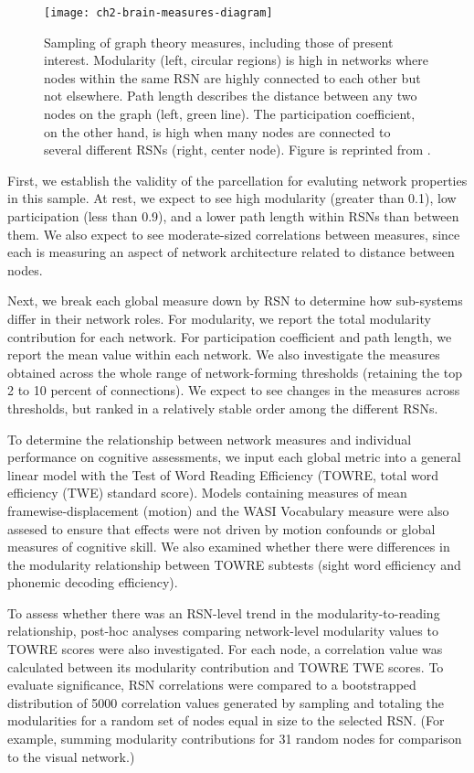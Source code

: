 \begin{figure}[t]
    \centering
    \texttt{[image: ch2-brain-measures-diagram]}
    \caption[Sampling of graph theory measures.]{Sampling of graph theory measures, including those of present interest. Modularity (left, circular regions) is high in networks where nodes within the same RSN are highly connected to each other but not elsewhere. Path length describes the distance between any two nodes on the graph (left, green line). The participation coefficient, on the other hand, is high when many nodes are connected to several different RSNs (right, center node). Figure is reprinted from \citep{Rubinov2010}.}
    \label{fig:ch2-brain-measures-diagram}
\end{figure}

First, we establish the validity of the parcellation for evaluting network properties in this sample. At rest, we expect to see high modularity (greater than 0.1), low participation (less than 0.9), and a lower path length within RSNs than between them. We also expect to see moderate-sized correlations between measures, since each is measuring an aspect of network architecture related to distance between nodes.  

Next, we break each global measure down by RSN to determine how sub-systems differ in their network roles. For modularity, we report the total modularity contribution for each network. For participation coefficient and path length, we report the mean value within each network. We also investigate the measures obtained across the whole range of network-forming thresholds (retaining the top 2 to 10 percent of connections). We expect to see changes in the measures across thresholds, but ranked in a relatively stable order among the different RSNs. 

To determine the relationship between network measures and individual performance on cognitive assessments, we input each global metric into a general linear model with the Test of Word Reading Efficiency (TOWRE, total word efficiency (TWE) standard score). Models containing measures of mean framewise-displacement (motion) and the WASI Vocabulary measure were also assesed to ensure that effects were not driven by motion confounds or global measures of cognitive skill. We also examined whether there were differences in the modularity relationship between TOWRE subtests (sight word efficiency  and phonemic decoding efficiency). 

To assess whether there was an RSN-level trend in the modularity-to-reading relationship, post-hoc analyses comparing network-level modularity values to TOWRE scores were also investigated. For each node, a correlation value was calculated between its modularity contribution and TOWRE TWE scores. To evaluate significance, RSN correlations were compared to a bootstrapped distribution of 5000 correlation values generated by sampling and totaling the modularities for a random set of nodes equal in size to the selected RSN. (For example, summing modularity contributions for 31 random nodes for comparison to the visual network.)


